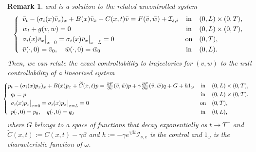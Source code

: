 \documentclass[10pt]{article}
\newtheorem{rmq}{Remark}
\def\dis{\displaystyle}
\def\\Phivec{\mathbf{\Phi}}
\begin{document}
\begin{rmq}
{and is a solution to the related uncontrolled system\,
\[
    \left\{
        \begin{array}{lcl}
        \bar v_t
        -(\sigma_i(x) \bar v_x)_x+{ B(x)\bar v_x+C(x,t)\bar v}
        =F(\bar v,\bar w)+\mathcal{I}_{s,i}            &\mbox{in}&(0,L) \times (0,T),    \\
        \noalign{\smallskip}\dis
        \bar w_t   +g(\bar v,\bar w)= 0         &\mbox{in}&(0,L) \times (0,T),    \\
        \noalign{\smallskip}\dis
        \sigma_i(x)\bar v_x\big|_{x=0}=\sigma_i(x)\bar v_x\big|_{x=L} = 0    &\mbox{on}&(0,T),            \\
        \noalign{\smallskip}\dis
        \bar v(\cdot,0) =\bar v_0,\quad \bar w(\cdot,0) =\bar w_0           &\mbox{in}&(0,L).
        \end{array}
    \right.
\]
	Then, we can relate the exact controllability to trajectories for $(v,w)$ to the null controllability
	of a linearized system
\[
    \!\!\!\!\!\left\{
        \begin{array}{lcl}
         \!\!\!p_t-(\sigma_i(x) p_x)_x +{ B(x) p_x+\widetilde C(x,t)p}
         ={\partial F\over \partial v}(\bar v,\bar w)p +\gamma{\partial F\over \partial w}(\bar v,\bar w)q +G+h1_{\omega}         &  \mbox{in}&    (0,L) \times (0,T),      \\
            \noalign{\smallskip}\dis
            q_t  =   p                    &  \mbox{in}& (0,L) \times (0,T),        \\
            \noalign{\smallskip}\dis
            \sigma_i(x)p_x\big|_{x=0}=\sigma_i(x)p_x\big|_{x=L} = 0            & \mbox{on}& (0,T),    \\
            \noalign{\smallskip}\dis
            p(\cdot,0) =p_0,\quad q(\cdot,0) =q_0         & \mbox{in}&   (0,L),
        \end{array}
    \right.
\]
    where $G$ belongs to a space of functions that decay exponentially as $t\rightarrow T^-$
    and $\widetilde C(x,t):=C(x,t)-\gamma\beta$ and ${ h:=-\gamma e^{\gamma\beta t}\mathcal{I}_{s,e}}$
    is the control and $1_\omega$ is the characteristic function of $\omega$.

}
\end{rmq}
\end{document}

